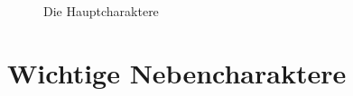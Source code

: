 \begin{figure}[hb!]
	\caption{Die Hauptcharaktere} 
	\label{img:passanasdte}
\end{figure}


\clearpage
\section{Wichtige Nebencharaktere}

\begin{figure}[hb!]

\end{figure}
